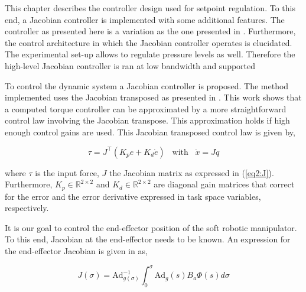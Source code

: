 
This chapter describes the controller design used for setpoint regulation. To this end, a Jacobian controller is implemented with some additional features. The controller as presented here is a variation as the one presented in \cite{MOOSAVIAN20071226}. Furthermore, the control architecture in which the Jacobian controller operates is elucidated. The experimental set-up allows to regulate pressure levels as well. Therefore the high-level Jacobian controller is ran at low bandwidth and supported 







To control the dynamic system a Jacobian controller is proposed. The method implemented uses the Jacobian transposed as presented in . This work shows that a computed torque controller can be approximated by a more straightforward control law involving the Jacobian transpose. This approximation holds if high enough control gains are used. This Jacobian transposed control law is given by,

\begin{equation}
    \tau = J^\top (K_p e + K_d \dot{e}) \hspace{10pt} \text{with}  \hspace{10pt} \dot{x} = J\dot{q}
    \label{eq:tau}
\end{equation}

where $\tau$ is the input force, $J$ the Jacobian matrix as expressed in (\ref{eq2:J}). Furthermore, $K_p \in \mathbb{R}^{2\times 2}$ and $K_d \in \mathbb{R}^{2\times 2}$ are diagonal gain matrices that correct for the error and the error derivative expressed in task space variables, respectively. 

It is our goal to control the end-effector position of the soft robotic manipulator. To this end, Jacobian at the end-effector needs to be known. An expression for the end-effector Jacobian is given in \cite{Boyer2019} as,

\begin{equation}
    J(\sigma) = \text{Ad}^{-1}_{g(\sigma)} \int_0^\sigma \text{Ad}_g(s) B_a \Phi(s)d\sigma
\end{equation}


